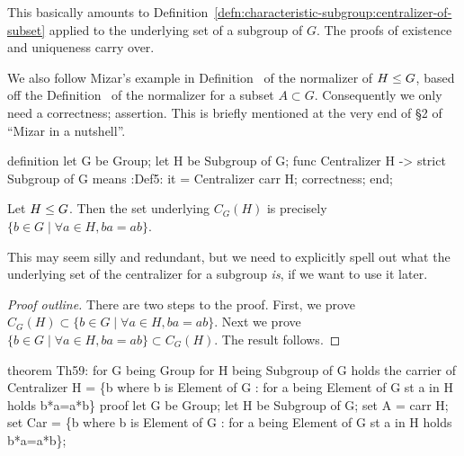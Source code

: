 \begin{def-remark}
This basically amounts to Definition~\ref{defn:characteristic-subgroup:centralizer-of-subset}
applied to the underlying set of a subgroup of $G$. The proofs of
existence and uniqueness carry over.
\end{def-remark}
\begin{def-remark}
We also follow Mizar's example in Definition~ of the
normalizer of $H\leq G$, based off the
Definition~ of the normalizer for a subset $A\subset G$.
Consequently we only need a {\Tt{}correctness;\nwendquote} assertion. This is briefly
mentioned at the very end of \S2 of ``Mizar in a nutshell''.
\end{def-remark}

\nwenddocs{}\endmoddef\nwstartdeflinemarkup{}\nwenddeflinemarkup
definition
  let G be Group;
  let H be Subgroup of G;
  func Centralizer H -> strict Subgroup of G means
  :Def5:
  it = Centralizer carr H;
  correctness;
end;
\eatline
{}\nwendcode{}\nwdocspar
\begin{theorem}
  Let $H\leq G$. Then the set underlying $C_{G}(H)$ is precisely
  $\{b\in G\mid\forall a\in H, ba=ab\}$.
\end{theorem}

\begin{thm-remark}
  This may seem silly and redundant, but we need to explicitly spell out
  what the underlying set of the centralizer for a subgroup \emph{is},
  if we want to use it later.
\end{thm-remark}

\begin{proof}[Proof outline]
  There are two steps to the proof. First, we prove
  $C_{G}(H) \subset \{b\in G\mid\forall a\in H, ba=ab\}$.
  Next we prove $\{b\in G\mid\forall a\in H, ba=ab\}\subset C_{G}(H)$.
  The result follows.
\end{proof}

\nwenddocs{}\endmoddef\nwstartdeflinemarkup{}\nwenddeflinemarkup
theorem Th59:
  for G being Group
  for H being Subgroup of G
  holds the carrier of Centralizer H = \{b where b is Element of G : for a
  being Element of G st a in H holds b*a=a*b\}
proof
  let G be Group;
  let H be Subgroup of G;
  set A = carr H;
  set Car = \{b where b is Element of G : for a being Element of G st a in H
                                         holds b*a=a*b\};


